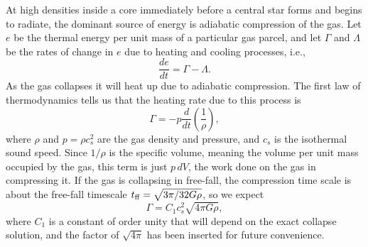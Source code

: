At high densities inside a core immediately before a central star forms and begins to radiate, the dominant source of energy is adiabatic compression of the gas. Let $e$ be the thermal energy per unit mass of a particular gas parcel, and let $\Gamma$ and $\Lambda$ be the rates of change in $e$ due to heating and cooling processes, i.e.,
\begin{equation}
\frac{de}{dt} = \Gamma - \Lambda.
\end{equation}
As the gas collapses it will heat up due to adiabatic compression. The first law of thermodynamics tells us that the heating rate due to this process is
\begin{equation}
\label{eq:gamma_ad}
\Gamma = -p \frac{d}{dt}\left(\frac{1}{\rho}\right),
\end{equation}
where $\rho$ and $p=\rho c_s^2$ are the gas density and pressure, and $c_s$ is the isothermal sound speed. Since $1/\rho$ is the specific volume, meaning the volume per unit mass occupied by the gas, this term is just $p\,dV$, the work done on the gas in compressing it. If the gas is collapsing in free-fall, the compression time scale is about the free-fall timescale $t_{\rm ff} = \sqrt{3\pi/32G\rho}$, so we expect
\begin{equation}
\Gamma = C_1 c_s^2 \sqrt{4\pi G\rho},
\end{equation}
where $C_1$ is a constant of order unity that will depend on the exact collapse solution, and the factor of $\sqrt{4\pi}$ has been inserted for future convenience.

